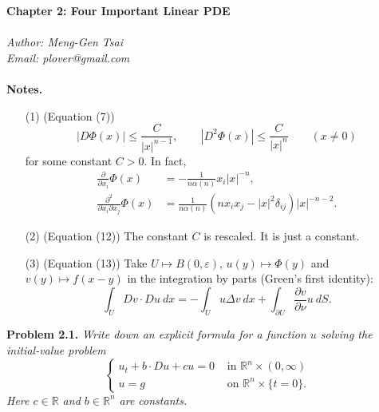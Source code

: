 \documentclass{article}
\begin{document}
\textbf{\Large Chapter 2: Four Important Linear PDE} \\\\



\emph{Author: Meng-Gen Tsai} \\
\emph{Email: plover@gmail.com} \\\\









\textbf{Notes.}
\begin{enumerate}
\item[(1)]
  (Equation (7))
  \[
    |D\Phi(x)| \leq \frac{C}{|x|^{n-1}}, \qquad
    |D^2\Phi(x)| \leq \frac{C}{|x|^{n}} \qquad (x \neq 0)
  \]
  for some constant $C > 0$.
  In fact,
  \begin{align*}
  \frac{\partial}{\partial x_i}\Phi(x)
  &= -\frac{1}{n\alpha(n)} x_i |x|^{-n}, \\
  \frac{\partial^2}{\partial x_i \partial x_j}\Phi(x)
  &= \frac{1}{n\alpha(n)} (n x_i x_j - |x|^2 \delta_{ij}) |x|^{-n-2}.
  \end{align*}

\item[(2)]
  (Equation (12))
  The constant $C$ is rescaled.
  It is just a constant.

\item[(3)]
  (Equation (13))
  Take $U \mapsto B(0,\varepsilon)$, $u(y) \mapsto \Phi(y)$ and $v(y) \mapsto f(x-y)$
  in the integration by parts (Green's first identity):
  \[
    \int_{U} Dv \cdot Du \: dx
    = -\int_{U} u \Delta v \: dx
      + \int_{\partial U} \frac{\partial v}{\partial \nu} u \: dS.
  \]

\end{enumerate}






\textbf{Problem 2.1.}
\emph{Write down an explicit formula for a function $u$ solving
the initial-value problem
\begin{equation*}
  \begin{cases}
    u_t + b \cdot Du + cu = 0 & \text{ in } \mathbb{R}^n \times (0,\infty) \\
    u                     = g & \text{ on } \mathbb{R}^n \times \{ t=0 \}.
  \end{cases}
\end{equation*}
Here $c \in \mathbb{R}$ and $b \in \mathbb{R}^n$ are constants.} \\
\end{document}
